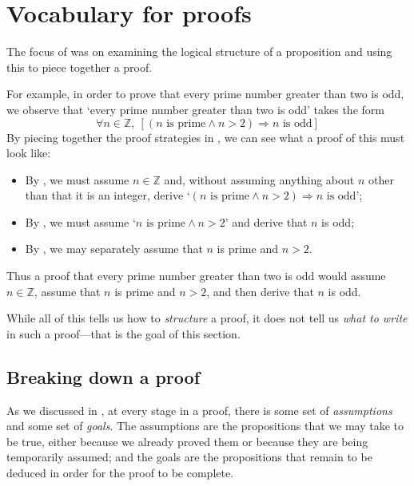 \section{Vocabulary for proofs}
\label{secVocabulary}

The focus of  was on examining the logical structure of a proposition and using this to piece together a proof.

For example, in order to prove that every prime number greater than two is odd, we observe that `every prime number greater than two is odd' takes the form
\[ \forall n \in \mathbb{Z},~ [({n \text{ is prime}} \wedge {n > 2}) \Rightarrow {n \text{ is odd}}] \]
By piecing together the proof strategies in , we can see what a proof of this must look like:
\begin{itemize}
\item By , we must assume $n \in \mathbb{Z}$ and, without assuming anything about $n$ other than that it is an integer, derive `$({n \text{ is prime}} \wedge {n > 2}) \Rightarrow {n \text{ is odd}}$';
\item By , we must assume `${n \text{ is prime}} \wedge {n > 2}$' and derive that $n$ is odd;
\item By , we may separately assume that $n$ is prime and $n > 2$.
\end{itemize}
Thus a proof that every prime number greater than two is odd would assume $n \in \mathbb{Z}$, assume that $n$ is prime and $n>2$, and then derive that $n$ is odd.

While all of this tells us how to \textit{structure} a proof, it does not tell us \textit{what to write} in such a proof---that is the goal of this section.

\subsection*{Breaking down a proof}

As we discussed in , at every stage in a proof, there is some set of \textit{assumptions} and some set of \textit{goals}. The assumptions are the propositions that we may take to be true, either because we already proved them or because they are being temporarily assumed; and the goals are the propositions that remain to be deduced in order for the proof to be complete.

